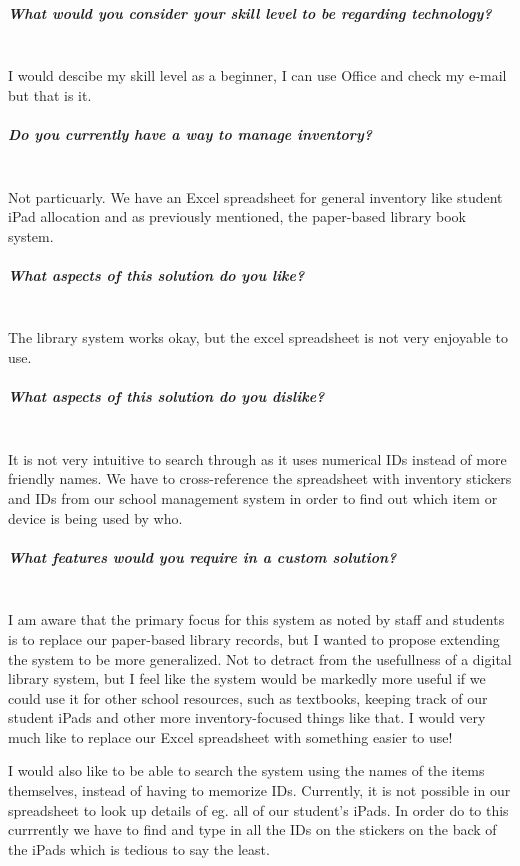 \documentclass[../../../main.tex]{subfiles}
\begin{document}
\subparagraph{What would you consider your skill level to be regarding technology?}

\noindent \\ I would descibe my skill level as a beginner, I can use Office and check my e-mail but that is it.

\subparagraph{Do you currently have a way to manage inventory?}

\noindent \\ Not particuarly. We have an Excel spreadsheet for general inventory like student iPad allocation and as previously mentioned, the paper-based library book system.

\subparagraph{What aspects of this solution do you like?}

\noindent \\ The library system works okay, but the excel spreadsheet is not very enjoyable to use.

\subparagraph{What aspects of this solution do you dislike?}

\noindent \\ It is not very intuitive to search through as it uses numerical IDs instead of more friendly names. We have to cross-reference the spreadsheet with inventory stickers and IDs from our school management system in order to find out which item or device is being used by who.

\subparagraph{What features would you require in a custom solution?}

\noindent \\ I am aware that the primary focus for this system as noted by staff and students
is to replace our paper-based library records, but I wanted to propose extending the system to
be more generalized. Not to detract from the usefullness of a digital library system,
but I feel like the system would be markedly more useful if we could use it for other school
resources, such as textbooks, keeping track of our student iPads and other more
inventory-focused things like that. I would very much like to replace our Excel spreadsheet with something easier to use!

I would also like to be able to search the system using the names of the items themselves, instead of having to memorize IDs.
Currently, it is not possible in our spreadsheet to look up details of eg. all of our student's iPads.
In order do to this currrently we have to find and type in all the IDs on the stickers on the back of the iPads which is tedious to say the least.
\end{document}
